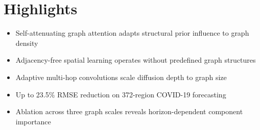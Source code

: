 \documentclass[11pt]{article}
\begin{document}
\section*{Highlights}

\begin{itemize}
\item Self-attenuating graph attention adapts structural prior influence to graph density
\item Adjacency-free spatial learning operates without predefined graph structures
\item Adaptive multi-hop convolutions scale diffusion depth to graph size
\item Up to 23.5\% RMSE reduction on 372-region COVID-19 forecasting
\item Ablation across three graph scales reveals horizon-dependent component importance
\end{itemize}
\end{document}

